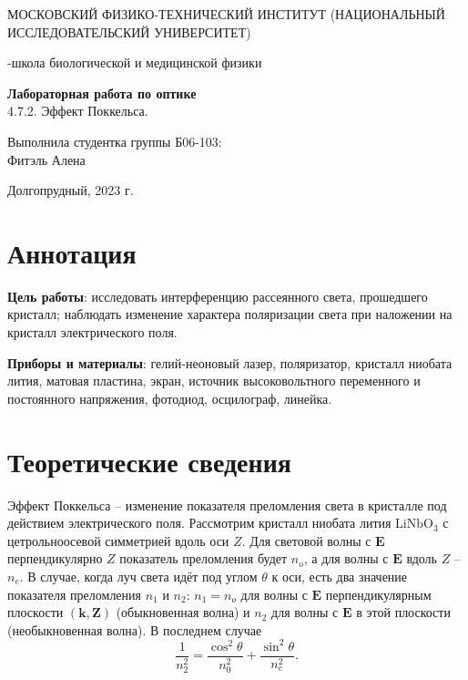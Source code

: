 \documentclass[a4paper,12pt]{article}
\begin{document}
\def\figurename{Рисунок}
\begin{titlepage}
\begin{center}
    {\large МОСКОВСКИЙ ФИЗИКО-ТЕХНИЧЕСКИЙ ИНСТИТУТ (НАЦИОНАЛЬНЫЙ ИССЛЕДОВАТЕЛЬСКИЙ УНИВЕРСИТЕТ)}
\end{center}
\begin{center}
    {-школа биологической и медицинской физики}
\end{center}

\vspace{1cm}
{\huge
\begin{center}
    {\bf Лабораторная работа по оптике}\\
    \vspace{0.5cm}
    4.7.2. Эффект Поккельса.
\end{center}
}

\vspace{4cm}
\begin{flushright}
{\LARGE Выполнила студентка группы Б06-103:\\ Фитэль Алена \\}

\end{flushright}
\vspace{9cm}
\begin{center}
    Долгопрудный, 2023 г.
\end{center}
\end{titlepage}
\newpage


\section{Аннотация}
\textbf{Цель работы}: исследовать интерференцию рассеянного света, прошедшего кристалл; наблюдать изменение характера поляризации света при наложении на кристалл электрического поля.

\textbf{Приборы и материалы}: гелий-неоновый лазер, поляризатор, кристалл ниобата лития, матовая пластина, экран, источник высоковольтного переменного и постоянного напряжения, фотодиод, осцилограф, линейка.


\section{Теоретические сведения}

Эффект Поккельса -- изменение показателя преломления света в кристалле под действием электрического поля.
Рассмотрим кристалл ниобата лития $\text{LiNbO}_3$ с цетрольноосевой симметрией вдоль оси $Z$. Для световой волны с $\mathbf{E}$ перпендикулярно $Z$ показатель преломления будет $n_o$, а для волны с $\mathbf{E}$ вдоль $Z$ -- $n_e$. В случае, когда луч света идёт под углом $\theta$ к оси, есть два значение показателя преломления $n_1$ и $n_2$: $n_1 = n_o$ для волны с $\mathbf{E}$ перпендикулярным плоскости $(\mathbf{k},\mathbf{Z})$ (обыкновенная волна) и $n_2$ для волны с $\mathbf{E}$ в этой плоскости (необыкновенная волна). В последнем случае
\begin{equation}
\dfrac{1}{n_2^2}=\dfrac{\cos^2 \theta}{n_0^2}+\dfrac{\sin^2 \theta}{n_e^2}.
\end{equation}
\end{document}
